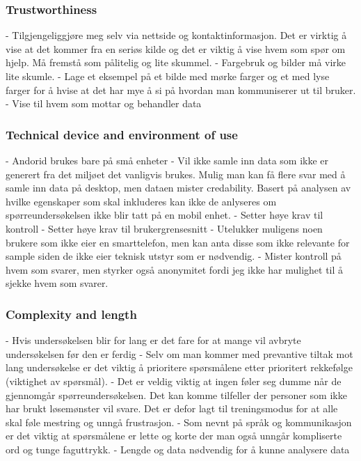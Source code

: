     \subsubsection*{Trustworthiness}
      - Tilgjengeliggjøre meg selv via nettside og kontaktinformasjon. Det er virktig å vise at det kommer fra en seriøs kilde og det er viktig å vise hvem som spør om hjelp. Må fremstå som pålitelig og lite skummel. 
      - Fargebruk og bilder må virke lite skumle. 
      - Lage et eksempel på et bilde med mørke farger og et med lyse farger for å hvise at det har mye å si på hvordan man kommuniserer ut til bruker. 
      - Vise til hvem som mottar og behandler data

    \subsubsection*{Technical device and environment of use}
      - Andorid brukes bare på små enheter
      - Vil ikke samle inn data som ikke er generert fra det miljøet det vanligvis brukes. Mulig man kan få flere svar med å samle inn data på desktop, men dataen mister credability. Basert på analysen av hvilke egenskaper som skal inkluderes kan ikke de anlyseres om spørreundersøkelsen ikke blir tatt på en mobil enhet. 
      - Setter høye krav til kontroll
      - Setter høye krav til brukergrensesnitt
      - Utelukker muligens noen brukere som ikke eier en smarttelefon, men kan anta disse som ikke relevante for sample siden de ikke eier teknisk utstyr som er nødvendig. 
      - Mister kontroll på hvem som svarer, men styrker også anonymitet fordi jeg ikke har mulighet til å sjekke hvem som svarer.

    \subsubsection*{Complexity and length}
      - Hvis undersøkelsen blir for lang er det fare for at mange vil avbryte undersøkelsen før den er ferdig
      - Selv om man kommer med prevantive tiltak mot lang undersøkelse er det viktig å prioritere spørsmålene etter prioritert rekkefølge (viktighet av spørsmål).
      - Det er veldig viktig at ingen føler seg dumme når de gjennomgår spørreundersøkelsen. Det kan komme tilfeller der personer som ikke har brukt løsemønster vil svare. Det er defor lagt til treningsmodus for at alle skal føle mestring og unngå frustrasjon.
      - Som nevnt på språk og kommunikasjon er det viktig at spørsmålene er lette og korte der man også unngår kompliserte ord og tunge faguttrykk.
      - Lengde og data nødvendig for å kunne analysere data

